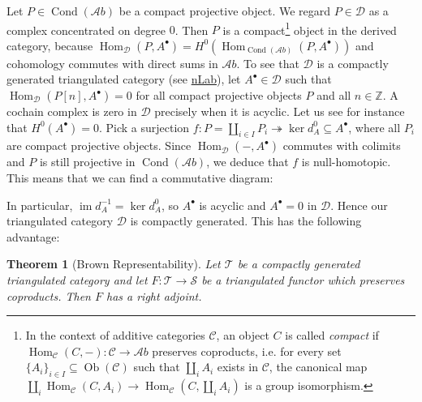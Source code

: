 \documentclass[11pt,A4]{article}
\theoremstyle{plain}
\newtheorem{thm}{Theorem}[section]
\theoremstyle{definition}
\theoremstyle{remark}
\newcommand{\Z}{\mathbb{Z}}
\newcommand{\1}{\mathbbm{1}}
\newcommand{\scrC}{\mathscr{C}}
\newcommand{\Ab}{\mathscr{A}b}
\newcommand{\D}{\mathscr{D}}
\DeclareMathOperator{\Hom}{Hom}
\DeclareMathOperator{\Cond}{Cond}
\DeclareMathOperator{\Ob}{Ob}
\DeclareMathOperator{\im}{im}
\newcommand{\grd}{^{\bullet}}
\begin{document}
Let $P\in \Cond(\Ab)$ be a compact projective object.
We regard $P\in \D$ as a complex concentrated on degree $0$.
Then $P$ is a compact\footnote{In the context of additive categories $\scrC$, an object $C$ is called \textit{compact} if $\Hom_{\scrC}(C,-)\colon \scrC\to \Ab$ preserves coproducts, i.e. for every set $\{A_{i}\}_{i\in I}\subseteq \Ob(\scrC)$ such that $\coprod_{i}A_{i}$ exists in $\scrC$, the canonical map $\coprod_{i}\Hom_{\scrC}(C,A_{i})\to \Hom_{\scrC}(C,\coprod_{i}A_{i})$ is a group isomorphism.} object in the derived category, because $\Hom_{\D}(P,A\grd)=H^{0}(\Hom_{\Cond(\Ab)}(P,A\grd))$ and cohomology commutes with direct sums in $\Ab$.
To see that $\D$ is a compactly generated triangulated category (see \href{https://ncatlab.org/nlab/show/compactly+generated+triangulated+category}{nLab}), let $A\grd\in \D$ such that $\Hom_{\D}(P[n],A\grd)=0$ for all compact projective objects $P$ and all $n\in \Z$.
A cochain complex is zero in $\D$ precisely when it is acyclic.
Let us see for instance that $H^{0}(A\grd)=0$.
Pick a surjection $f\colon P=\coprod_{i\in I}P_{i}\twoheadrightarrow \ker{d_{A}^{0}}\subseteq A\grd$, where all $P_{i}$ are compact projective objects.
Since $\Hom_{\D}(-,A\grd)$ commutes with colimits and $P$ is still projective in $\Cond(\Ab)$, we deduce that $f$ is null-homotopic.
This means that we can find a commutative diagram:
\begin{center}
\end{center}
In particular, $\im{d_{A}^{-1}}=\ker{d_{A}^{0}}$, so $A\grd$ is acyclic and $A\grd=0$ in $\D$.
Hence our triangulated category $\D$ is compactly generated.
This has the following advantage:

\begin{thm}[Brown Representability]
    Let $\mathscr{T}$ be a compactly generated triangulated category and let $F\colon \mathscr{T}\to \mathscr{S}$ be a triangulated functor which preserves coproducts.
    Then $F$ has a right adjoint.
\end{thm}



\end{document}
